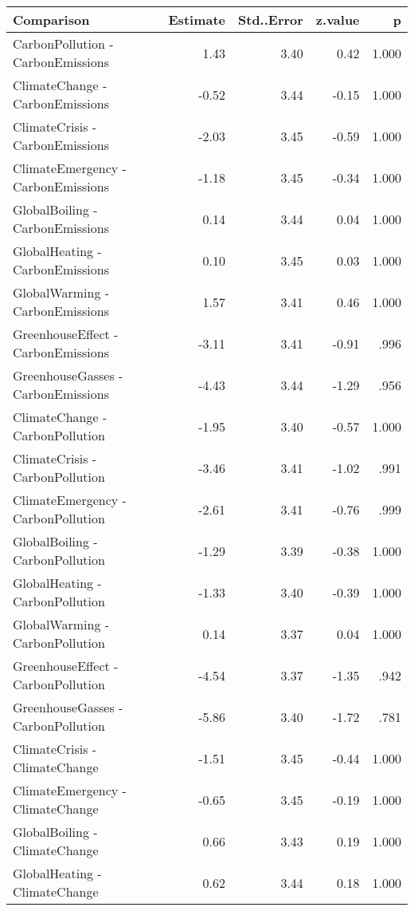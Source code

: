 \begin{table}[ht]
\centering
\begin{tabular}{lrrrr}
  \hline
Comparison & Estimate & Std..Error & z.value & p \\ 
  \hline
CarbonPollution - CarbonEmissions & 1.43 & 3.40 & 0.42 & 1.000 \\ 
  ClimateChange - CarbonEmissions & -0.52 & 3.44 & -0.15 & 1.000 \\ 
  ClimateCrisis - CarbonEmissions & -2.03 & 3.45 & -0.59 & 1.000 \\ 
  ClimateEmergency - CarbonEmissions & -1.18 & 3.45 & -0.34 & 1.000 \\ 
  GlobalBoiling - CarbonEmissions & 0.14 & 3.44 & 0.04 & 1.000 \\ 
  GlobalHeating - CarbonEmissions & 0.10 & 3.45 & 0.03 & 1.000 \\ 
  GlobalWarming - CarbonEmissions & 1.57 & 3.41 & 0.46 & 1.000 \\ 
  GreenhouseEffect - CarbonEmissions & -3.11 & 3.41 & -0.91 & .996 \\ 
  GreenhouseGasses - CarbonEmissions & -4.43 & 3.44 & -1.29 & .956 \\ 
  ClimateChange - CarbonPollution & -1.95 & 3.40 & -0.57 & 1.000 \\ 
  ClimateCrisis - CarbonPollution & -3.46 & 3.41 & -1.02 & .991 \\ 
  ClimateEmergency - CarbonPollution & -2.61 & 3.41 & -0.76 & .999 \\ 
  GlobalBoiling - CarbonPollution & -1.29 & 3.39 & -0.38 & 1.000 \\ 
  GlobalHeating - CarbonPollution & -1.33 & 3.40 & -0.39 & 1.000 \\ 
  GlobalWarming - CarbonPollution & 0.14 & 3.37 & 0.04 & 1.000 \\ 
  GreenhouseEffect - CarbonPollution & -4.54 & 3.37 & -1.35 & .942 \\ 
  GreenhouseGasses - CarbonPollution & -5.86 & 3.40 & -1.72 & .781 \\ 
  ClimateCrisis - ClimateChange & -1.51 & 3.45 & -0.44 & 1.000 \\ 
  ClimateEmergency - ClimateChange & -0.65 & 3.45 & -0.19 & 1.000 \\ 
  GlobalBoiling - ClimateChange & 0.66 & 3.43 & 0.19 & 1.000 \\ 
  GlobalHeating - ClimateChange & 0.62 & 3.44 & 0.18 & 1.000 \\ 

\end{tabular}
\end{table}

